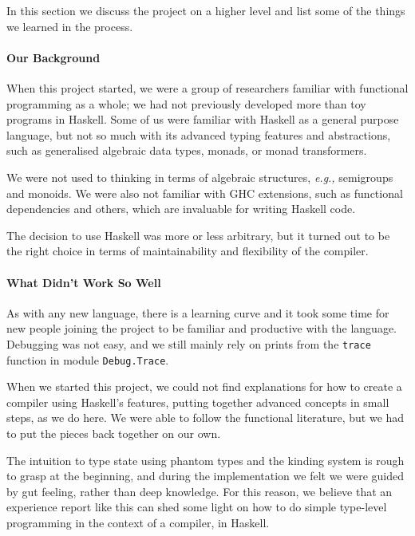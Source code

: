 \documentclass[sigplan,screen]{acmart}
\makeatletter
\newcommand{\ec}[1]{\lstinline[style=encore,breaklines=true,basicstyle=\fontsize{9}{9}\tt]@#1@}
\makeatother
\begin{document}
In this section we discuss the project on a higher level and list
some of the things we learned in the process.

\paragraph{Our Background}

When this project started, we were a group of researchers familiar
with functional programming as a whole; we had not previously developed
more than toy programs in Haskell.
%
Some of us were familiar with Haskell as a general purpose language,
but not so much with its advanced typing features and abstractions,
such as generalised algebraic data types,
monads, or monad transformers.

We were not used to thinking in terms
of algebraic structures, \textit{e.g.,} semigroups and monoids.
We were also not familiar with GHC extensions, such as functional dependencies and others,
which are invaluable for writing Haskell code.

The decision to use Haskell was more or less arbitrary, but it
turned out to be the right choice in terms of maintainability and
flexibility of the compiler.

\paragraph{What Didn't Work So Well}

As with any new language, there is a learning curve and it took some
time for new people joining the project to be familiar and productive
with the language.
%
Debugging  was not easy, and we still mainly rely on
prints from the \ec{trace} function in module \ec{Debug.Trace}.

When we started this project, we could not find explanations for
how to create a compiler using Haskell's features, putting
together advanced concepts in small steps, as we do here. We were
able to follow the functional literature, but we had to put the
pieces back together on our own.

The intuition to type state using phantom types and the kinding system
is rough to grasp at the beginning, and during the implementation we felt we were
guided by gut feeling, rather than deep knowledge. For this reason,
we believe that an experience report like this can shed some light
on how to do simple type-level programming in the context of a compiler, in Haskell.
\end{document}

